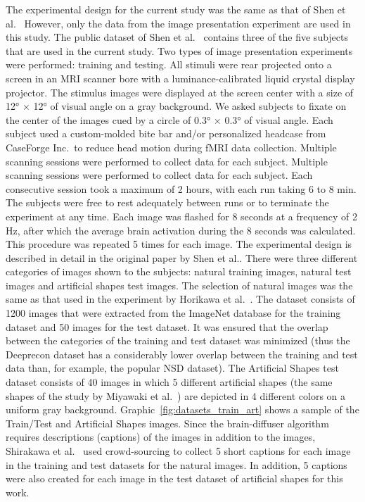 The experimental design for the current study was the same as that of Shen et al.\ \cite{shenDeepImageReconstruction2019} However, only the data from the image presentation experiment are used in this study. The public dataset of Shen et al.\ \cite{ds001506:1.3.1} contains three of the five subjects that are used in the current study.  Two types of image presentation experiments were performed: training and testing. All stimuli were rear projected onto a screen in an MRI scanner bore with a luminance-calibrated liquid crystal display projector. The stimulus images were displayed at the screen center with a size of 12° $\times$ 12° of visual angle on a gray background. We asked subjects to fixate on the center of the images cued by a circle of 0.3° $\times$ 0.3° of visual angle. Each subject used a custom-molded bite bar and/or personalized headcase from CaseForge Inc.\ to reduce head motion during fMRI data collection. Multiple scanning sessions were performed to collect data for each subject. Multiple scanning sessions were performed to collect data for each subject. Each consecutive session took a maximum of 2 hours, with each run taking 6 to 8 min. The subjects were free to rest adequately between runs or to terminate the experiment at any time. Each image was flashed for 8 seconds at a frequency of 2 Hz, after which the average brain activation during the 8 seconds was calculated. This procedure was repeated 5 times for each image. The experimental design is described in detail in the original paper by Shen et al.\cite{shenDeepImageReconstruction2019}. There were three different categories of images shown to the subjects: natural training images, natural test images and artificial shapes test images. The selection of natural images was the same as that used in the experiment by Horikawa et al.\ \cite{horikawaGenericDecodingSeen2017}. The dataset consists of 1200 images that were extracted from the ImageNet database\cite{dengImageNetLargescaleHierarchical2009} for the training dataset and 50 images for the test dataset. It was ensured that the overlap between the categories of the training and test dataset was minimized (thus the Deeprecon dataset has a considerably lower overlap between the training and test data than, for example, the popular NSD dataset\cite{allenMassive7TFMRI2022,shirakawaSpuriousReconstructionBrain2024}). The Artificial Shapes test dataset consists of 40 images in which 5 different artificial shapes (the same shapes of the study by Miyawaki et al.\ \cite{miyawakiVisualImageReconstruction2008}) are depicted in 4 different colors on a uniform gray background. Graphic~\ref{fig:datasets_train_art} shows a sample of the Train/Test and Artificial Shapes images. Since the brain-diffuser algorithm requires descriptions (captions) of the images in addition to the images, Shirakawa et al.\ \cite{shirakawaSpuriousReconstructionBrain2024} used crowd-sourcing to collect 5 short captions for each image in the training and test datasets for the natural images. In addition, 5 captions were also created for each image in the test dataset of artificial shapes for this work.

